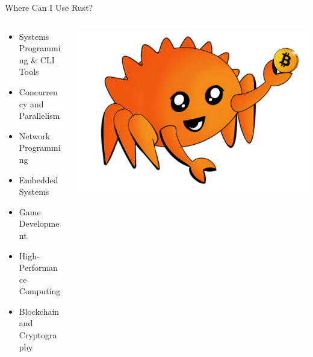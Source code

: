 \documentclass[10pt]{beamer}
\begin{document}
\begin{frame}{Where Can I Use Rust?}

\begin{columns}
\begin{column}{0.6\textwidth}
    \begin{itemize}
    \item Systems Programming \& CLI Tools
    \item Concurrency and Parallelism
    \item Network Programming
    \item Embedded Systems
    \item Game Development
    \item High-Performance Computing
    \item Blockchain and Cryptography    
\end{itemize}
\end{column}
\begin{column}{0.4\textwidth}  %
    \begin{center}
     \includegraphics[width=\textwidth]{img/mascot.png}
     \end{center}
\end{column}
\end{columns}
\end{frame}
\end{document}
